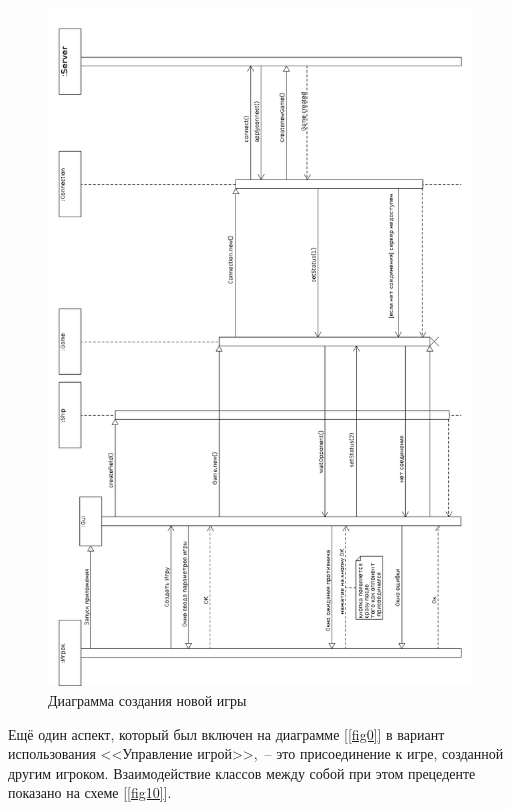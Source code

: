 \begin{figure}[pt]
\centering
\includegraphics[width=15cm]{images/CRG.png}
\caption{Диаграмма создания новой игры}
\label{fig9}
\end{figure}

\newpage
Ещё один аспект, который был включен на диаграмме [\ref{fig0}] в вариант использования <<Управление игрой>>,~-- это присоединение к игре, созданной другим игроком. Взаимодействие классов между собой при этом прецеденте показано на схеме [\ref{fig10}].

